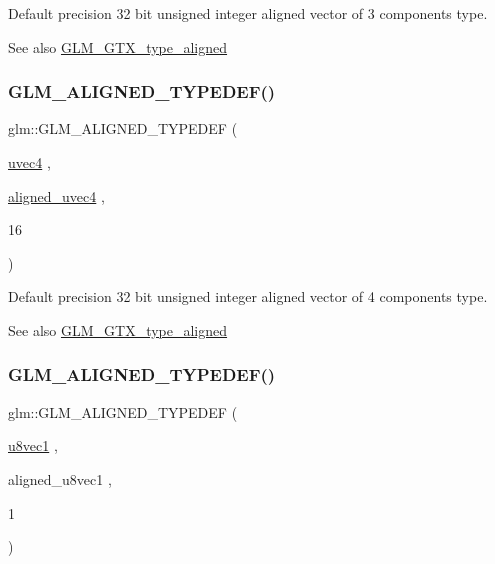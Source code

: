 Default precision 32 bit unsigned integer aligned vector of 3 components type. \begin{DoxySeeAlso}{See also}
\mbox{\hyperlink{group__gtx__type__aligned}{G\+L\+M\+\_\+\+G\+T\+X\+\_\+type\+\_\+aligned}} 
\end{DoxySeeAlso}
\mbox{\label{group__gtx__type__aligned_ga47edfdcee9c89b1ebdaf20450323b1d4}} 
\subsubsection{\texorpdfstring{GLM\_ALIGNED\_TYPEDEF()}{GLM\_ALIGNED\_TYPEDEF()}\hspace{0.1cm}{\footnotesize\ttfamily [120/209]}}
{\footnotesize\ttfamily glm\+::\+G\+L\+M\+\_\+\+A\+L\+I\+G\+N\+E\+D\+\_\+\+T\+Y\+P\+E\+D\+EF (\begin{DoxyParamCaption}\item[{\mbox{\hyperlink{group__core__types_ga1c426d19627b32b14f0089f7f4ba7b1d}{uvec4}}}]{,  }\item[{\mbox{\hyperlink{group__gtc__type__aligned_ga1e0792f3c64836e042ee3aad9bd8209c}{aligned\+\_\+uvec4}}}]{,  }\item[{16}]{ }\end{DoxyParamCaption})}

Default precision 32 bit unsigned integer aligned vector of 4 components type. \begin{DoxySeeAlso}{See also}
\mbox{\hyperlink{group__gtx__type__aligned}{G\+L\+M\+\_\+\+G\+T\+X\+\_\+type\+\_\+aligned}} 
\end{DoxySeeAlso}
\mbox{\label{group__gtx__type__aligned_ga5611d6718e3a00096918a64192e73a45}} 
\subsubsection{\texorpdfstring{GLM\_ALIGNED\_TYPEDEF()}{GLM\_ALIGNED\_TYPEDEF()}\hspace{0.1cm}{\footnotesize\ttfamily [121/209]}}
{\footnotesize\ttfamily glm\+::\+G\+L\+M\+\_\+\+A\+L\+I\+G\+N\+E\+D\+\_\+\+T\+Y\+P\+E\+D\+EF (\begin{DoxyParamCaption}\item[{\mbox{\hyperlink{group__gtc__type__precision_ga024be724ff45865952190522b03fc0d5}{u8vec1}}}]{,  }\item[{aligned\+\_\+u8vec1}]{,  }\item[{1}]{ }\end{DoxyParamCaption})}


